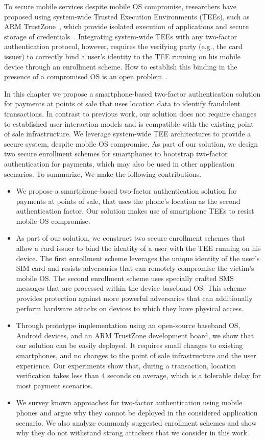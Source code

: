 To secure mobile services despite mobile OS compromise, researchers have
proposed using system-wide Trusted Execution Environments (TEEs), such as ARM
TrustZone~\cite{ARMTrustZone}, which provide isolated execution of applications
and secure storage of
credentials~\cite{sariou10hotmobile,liu12mobisys}. Integrating system-wide TEEs
with any two-factor authentication protocol, however, requires the verifying
party (e.g., the card issuer) to correctly bind a user's identity to the TEE
running on his mobile device through an enrollment scheme. How to establish this
binding in the presence of a compromised OS is an open
problem~\cite{2013_spsm_marforio}.

In this chapter we propose a smartphone-based two-factor authentication
solution for payments at points of sale that uses location data to identify
fraudulent transactions.  In contrast to previous work, our solution does not
require changes to established user interaction models and is compatible with
the existing point of sale infrastructure.  We leverage system-wide TEE
architectures to provide a secure system, despite mobile OS compromise.  As part
of our solution, we design two secure enrollment schemes for smartphones to
bootstrap two-factor authentication for payments, which may also be used in
other application scenarios. To summarize, We make the following contributions.

\begin{itemize}
\item We propose a smartphone-based two-factor authentication solution for
  payments at points of sale, that uses the phone's location as the second
  authentication factor. Our solution makes use of smartphone TEEs to resist
  mobile OS compromise.
\item As part of our solution, we construct two secure enrollment schemes that
  allow a card issuer to bind the identity of a user with the TEE running on his
  device. The first enrollment scheme leverages the unique identity of the
  user's SIM card and resists adversaries that can remotely compromise the
  victim's mobile OS. The second enrollment scheme uses specially crafted SMS
  messages that are processed within the device baseband OS. This scheme
  provides protection against more powerful adversaries that can additionally
  perform hardware attacks on devices to which they have physical access.
\item Through prototype implementation using an open-source baseband OS, Android
  devices, and an ARM TrustZone development board, we show that our solution can
  be easily deployed. It requires small changes to existing smartphones, and no
  changes to the point of sale infrastructure and the user experience. Our
  experiments show that, during a transaction, location verification takes less
  than 4 seconds on average, which is a tolerable delay for most payment
  scenarios.
\item We survey known approaches for two-factor authentication using mobile
  phones and argue why they cannot be deployed in the considered application
  scenario. We also analyze commonly suggested enrollment schemes and show why
  they do not withstand strong attackers that we consider in this work.
\end{itemize}

